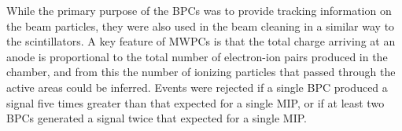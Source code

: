 While the primary purpose of the BPCs was to provide tracking information on the beam particles, they were also used in the beam cleaning in a similar way to the scintillators. A key feature of MWPCs is that the total charge arriving at an anode is proportional to the total number of electron-ion pairs produced in the chamber, and from this the number of ionizing particles that passed through the active areas could be inferred. Events were rejected if a single BPC produced a signal five times greater than that expected for a single MIP, or if at least two BPCs generated a signal twice that expected for a single MIP.






